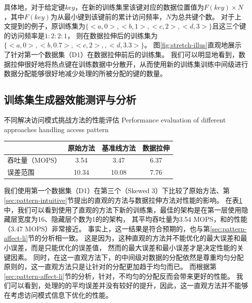 具体地，对于给定键$key$，在新的训练集里该键对应的数据位置值为$F(key) \times N$，其中$F(key)$为从最小键到该键前的累计访问频率，$N$为总共键个数。
对于上文提到的例子，原训练集为$\{<a, 0>, <b, 1>, <c, 2>, <d, 3>\}$且这三个键的访问频率是$1:2:2:1$，
则在数据拉伸后的训练集为$\{<a, 0>, <b, 0.7>, <c, 2>, , <d, 3.3>\}$。
图\ref{fig:stretch-illus}直观地展示了针对第一个数据集（D1）在数据拉伸前后的训练集。
我们可以明显地看到，数据拉伸很好地将热点键在训练数据中分散开，从而使用新的训练集训练中间级{\model}进行数据分配能够很好地减少处理{\hotkey}的{\model}所被分配的键的数量。


\subsection{训练集生成器效能测评与分析}

\begin{table}[!hpb]
  \centering
  \bicaption[不同解决访问模式挑战方法的性能评估]
    {不同解决访问模式挑战方法的性能评估}
    {Performance evaluation of different approaches handling access pattern}
  \label{tab:pattern-sol}
  \begin{tabular}{lccc}
  \toprule
                & 原始方法  & 基准线方法  & 数据拉伸  \\ \midrule
  吞吐量（MOPS）        & 3.54    & 3.47     & 6.37    \\
  误差范围  & 10.34     & 10.08     & 7.76     \\ \bottomrule
  \end{tabular}
\end{table}

我们使用第一个数据集（D1）在第三个{\skewwl}（Skewed 3）下比较了原始方法、第\ref{sec:pattern-intuitive}节提出的直观的方法与数据拉伸方法对{\li}性能的影响。
在表\ref{tab:pattern-sol}中，我们可以看到使用了直观的方法下新的训练集，最佳的{\rmi}架构是在第一层使用隐藏层宽度为16、隐藏层个数为1的{\nn}的{\rmi}架构，
其平均吞吐量为3.54 MOPS，和{\li}的性能（3.47 MOPS）非常接近。
事实上，这一结果是符合预期的，也与第\ref{sec:pattern-affect-li}节的分析相一致。
这是因为，这种直观的方法并不能优化{\model}的最大误差和最小误差，而是只能优化{\hotkey}的误差值，
然而{\model}的最大误差和最小误差才是决定{\li}性能的关键因素。
同时，在这一直观方法下，{\rmi}的中间级对数据的分配依然是尊重均匀分配原则的，这一直观方法只是让针对{\hotkey}的分配更加趋于均匀而已。
而根据第\ref{sec:pattern-affect-li}节的分析，针对{\hotkey}，不均匀的分配反而会带来更好的性能。
我们可以看到，处理{\hotkey}的{\model}的平均误差并没有较好的提升，因此，这一直观方法并不能够在考虑访问模式信息下优化{\li}的性能。

